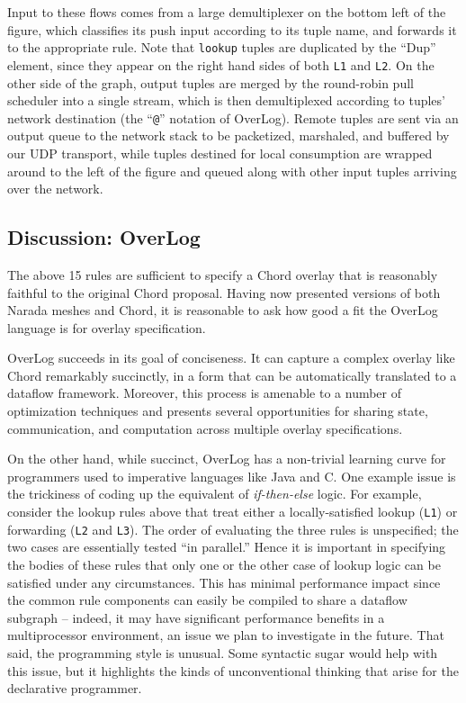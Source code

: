 \documentclass{sig-alt-full}
\def\Lang{OverLog\xspace}
\newcommand{\ol}[1]{{\tt\footnotesize#1}}
\begin{document}
Input to these flows comes from a large demultiplexer on the bottom
left of the figure, which classifies its push input according to
its tuple name, and forwards it to the appropriate rule. Note that 
\ol{lookup} tuples are duplicated by the ``Dup''
element, since they appear on the right hand sides of both \ol{L1}
and \ol{L2}.  On the other side of the graph, output tuples are merged by
the round-robin pull scheduler into a single stream, which is then
demultiplexed according to tuples' network destination (the ``\ol{@}''
notation of \Lang).  Remote tuples are sent via an output queue to the
network stack to be packetized, marshaled, and buffered by our
UDP transport, while tuples destined for local
consumption are wrapped around to the left of the figure and queued
along with other input tuples arriving over the network. 

\subsection{Discussion: \Lang}
\label{sec:chord-discuss}
The above 15 rules are sufficient to specify a Chord overlay
that is reasonably faithful to the original Chord proposal. 
Having now presented versions of both Narada meshes and Chord, it is
reasonable to ask how good a fit the \Lang language is for overlay
specification.  

\Lang succeeds in its goal of conciseness.  It can capture a
complex overlay like Chord remarkably succinctly, in a form that can
be automatically translated to a dataflow framework.  Moreover, this
process is amenable to a number of optimization techniques and
presents several opportunities for sharing state, communication, and
computation across multiple overlay specifications. 

On the other hand, while succinct, \Lang has a non-trivial learning
curve for programmers used to imperative languages like Java and C.
One example issue is the trickiness of coding up the equivalent of
\emph{if-then-else} logic.  For example, consider the lookup rules
above that treat either a locally-satisfied lookup (\ol{L1}) or
forwarding (\ol{L2} and \ol{L3}).  The order of evaluating the three
rules is unspecified; the two cases are essentially tested ``in
parallel.''  Hence it is important in specifying the bodies of these
rules that only one or the other case of
lookup logic can be satisfied under any circumstances.  This has
minimal performance impact since the common rule components can
easily be compiled to share a dataflow subgraph -- indeed, it may have
significant performance benefits in a multiprocessor environment, an
issue we plan to investigate in the future.  That said, the programming
style is unusual.  Some syntactic sugar would 
help with this issue, but it highlights the kinds of unconventional
thinking that arise for the declarative programmer.
\end{document}
